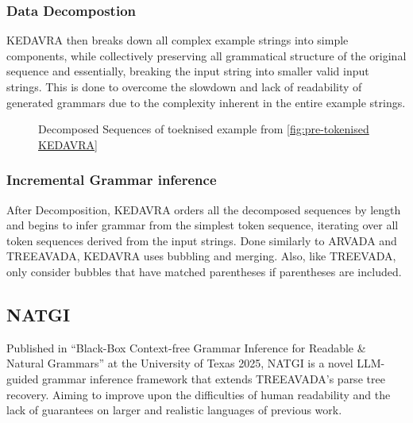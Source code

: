 \subsubsection{Data Decompostion}

KEDAVRA then breaks down all complex example strings into simple components, while collectively preserving all grammatical structure of the original sequence and essentially, breaking the input string into smaller valid input strings. This is done to overcome the slowdown and lack of readability of generated grammars due to the complexity inherent in the entire example strings.

\begin{figure}[h!]
\centering
{}
\caption{Decomposed Sequences of toeknised example from \ref{fig:pre-tokenised KEDAVRA}}
\label{fig:decomp KEDAVRA}
\end{figure}

\subsubsection{Incremental Grammar inference}

After Decomposition, KEDAVRA orders all the decomposed sequences by length and begins to infer grammar from the simplest token sequence, iterating over all token sequences derived from the input strings. Done similarly to ARVADA and TREEAVADA, KEDAVRA uses bubbling and merging. Also, like TREEVADA, only consider bubbles that have matched parentheses if parentheses are included. 

\subsection{NATGI}

Published in \enquote{Black-Box Context-free Grammar Inference for Readable \& Natural Grammars} at the University of Texas 2025\cite{arefinBlackboxContextfreeGrammar2025}, NATGI is a novel LLM-guided grammar inference framework that extends TREEAVADA's parse tree recovery. Aiming to improve upon the difficulties of human readability and the lack of guarantees on larger and realistic languages of previous work.

